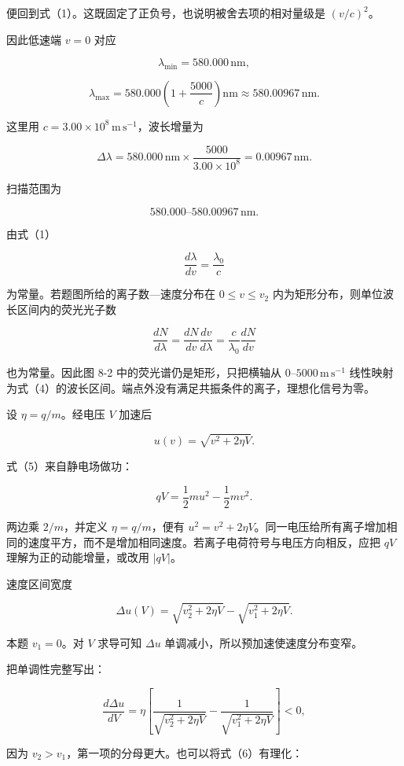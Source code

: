 \documentclass[12pt,a4paper,UTF8]{ctexart}
\begin{document}
便回到式（1）。这既固定了正负号，也说明被舍去项的相对量级是
\((v/c)^2\)。

因此低速端 \(v=0\) 对应

\[
\lambda_{\min}=580.000\,\mathrm{nm},
\tag{2}
\]

\[
\lambda_{\max}
=580.000\left(1+\frac{5000}{c}\right)\mathrm{nm}
\approx580.00967\,\mathrm{nm}.
\tag{3}
\]

这里用 \(c=3.00\times10^8\,\mathrm{m\,s^{-1}}\)，波长增量为

\[
\Delta\lambda
=580.000\,\mathrm{nm}\times\frac{5000}{3.00\times10^8}
=0.00967\,\mathrm{nm}.
\]

扫描范围为

\[
\boxed{580.000\text{--}580.00967\,\mathrm{nm}}.
\tag{4}
\]

由式（1）

\[
\frac{d\lambda}{dv}=\frac{\lambda_0}{c}
\]

为常量。若题图所给的离子数---速度分布在 \(0\le v\le v_2\)
内为矩形分布，则单位波长区间内的荧光光子数

\[
\frac{dN}{d\lambda}
=\frac{dN}{dv}\frac{dv}{d\lambda}
=\frac{c}{\lambda_0}\frac{dN}{dv}
\]

也为常量。因此图 8-2 中的荧光谱仍是矩形，只把横轴从
\(0\text{--}5000\,\mathrm{m\,s^{-1}}\)
线性映射为式（4）的波长区间。端点外没有满足共振条件的离子，理想化信号为零。

设 \(\eta=q/m\)。经电压 \(V\) 加速后

\[
u(v)=\sqrt{v^2+2\eta V}.
\tag{5}
\]

式（5）来自静电场做功：

\[
qV=\frac12mu^2-\frac12mv^2.
\]

两边乘 \(2/m\)，并定义 \(\eta=q/m\)，便有
\(u^2=v^2+2\eta V\)。同一电压给所有离子增加相同的速度平方，而不是增加相同速度。若离子电荷符号与电压方向相反，应把
\(qV\) 理解为正的动能增量，或改用 \(|qV|\)。

速度区间宽度

\[
\boxed{
\Delta u(V)
=\sqrt{v_2^2+2\eta V}
-\sqrt{v_1^2+2\eta V}
}.
\tag{6}
\]

本题 \(v_1=0\)。对 \(V\) 求导可知 \(\Delta u\)
单调减小，所以预加速使速度分布变窄。

把单调性完整写出：

\[
\frac{d\Delta u}{dV}
=\eta\left[
\frac1{\sqrt{v_2^2+2\eta V}}
-\frac1{\sqrt{v_1^2+2\eta V}}
\right]<0,
\tag{7}
\]

因为 \(v_2>v_1\)，第一项的分母更大。也可以将式（6）有理化：
\end{document}

